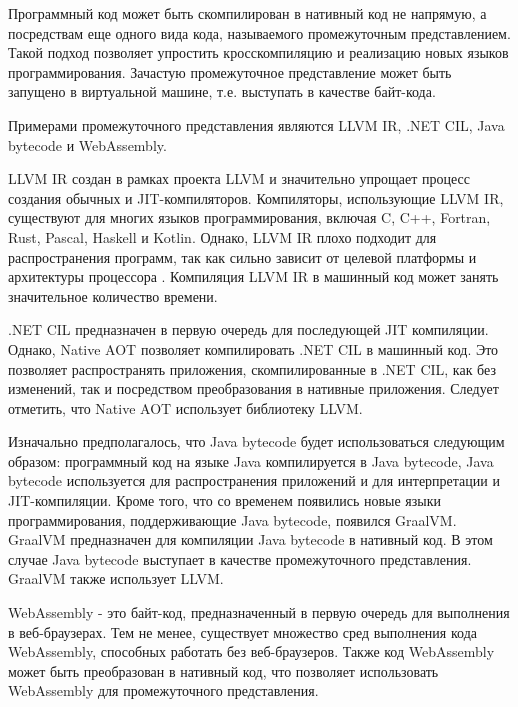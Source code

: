 Программный код может быть скомпилирован в нативный код не напрямую, а посредствам еще одного вида кода, называемого промежуточным представлением.
Такой подход позволяет упростить кросскомпиляцию и реализацию новых языков программирования. 
Зачастую промежуточное представление может быть запущено в виртуальной машине, т.е. выступать в качестве байт-кода.

Примерами промежуточного представления являются LLVM IR, .NET CIL, Java bytecode и WebAssembly.

LLVM IR создан в рамках проекта LLVM и значительно упрощает процесс создания обычных и JIT-компиляторов. 
Компиляторы, использующие LLVM IR, существуют для многих языков программирования, включая C, C++, Fortran, Rust, Pascal, Haskell и Kotlin. 
Однако, LLVM IR плохо подходит для распространения программ, так как сильно зависит от целевой платформы и архитектуры процессора \cite{LLVMNotPortable}.
Компиляция LLVM IR в машинный код может занять значительное количество времени.

.NET CIL предназначен в первую очередь для последующей JIT компиляции. 
Однако, Native AOT позволяет компилировать .NET CIL в машинный код.
Это позволяет распространять приложения, скомпилированные в .NET CIL, как без изменений, так и посредством преобразования в нативные приложения.
Следует отметить, что Native AOT использует библиотеку LLVM.

Изначально предполагалось, что Java bytecode будет использоваться следующим образом: программный код на языке Java компилируется в Java bytecode, Java bytecode используется для распространения приложений и для интерпретации и JIT-компиляции.
Кроме того, что со временем появились новые языки программирования, поддерживающие Java bytecode, появился GraalVM.
GraalVM предназначен для компиляции Java bytecode в нативный код.
В этом случае Java bytecode выступает в качестве промежуточного представления.
GraalVM также использует LLVM.

WebAssembly - это байт-код, предназначенный в первую очередь для выполнения в веб-браузерах.
Тем не менее, существует множество сред выполнения кода WebAssembly, способных работать без веб-браузеров.
Также код WebAssembly может быть преобразован в нативный код, что позволяет использовать WebAssembly для промежуточного представления.
